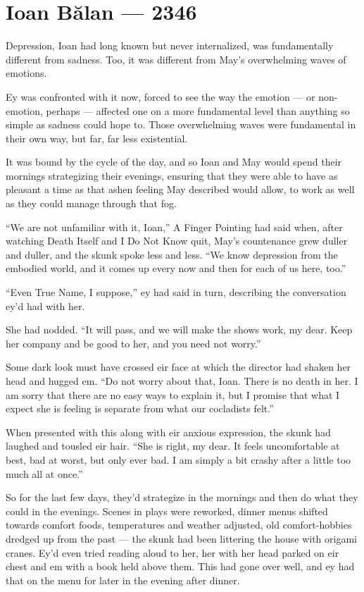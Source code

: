 \hypertarget{ioan-bux103lan-2346}{%
\chapter{Ioan Bălan — 2346}\label{ioan-bux103lan-2346}}

Depression, Ioan had long known but never internalized, was fundamentally different from sadness. Too, it was different from May's overwhelming waves of emotions.

Ey was confronted with it now, forced to see the way the emotion — or non-emotion, perhaps — affected one on a more fundamental level than anything so simple as sadness could hope to. Those overwhelming waves were fundamental in their own way, but far, far less existential.

It was bound by the cycle of the day, and so Ioan and May would spend their mornings strategizing their evenings, ensuring that they were able to have as pleasant a time as that ashen feeling May described would allow, to work as well as they could manage through that fog.

``We are not unfamiliar with it, Ioan,'' A Finger Pointing had said when, after watching Death Itself and I Do Not Know quit, May's countenance grew duller and duller, and the skunk spoke less and less. ``We know depression from the embodied world, and it comes up every now and then for each of us here, too.''

``Even True Name, I suppose,'' ey had said in turn, describing the conversation ey'd had with her.

She had nodded. ``It will pass, and we will make the shows work, my dear. Keep her company and be good to her, and you need not worry.''

Some dark look must have crossed eir face at which the director had shaken her head and hugged em. ``Do not worry about that, Ioan. There is no death in her. I am sorry that there are no easy ways to explain it, but I promise that what I expect she is feeling is separate from what our cocladists felt.''

When presented with this along with eir anxious expression, the skunk had laughed and tousled eir hair. ``She is right, my dear. It feels uncomfortable at best, bad at worst, but only ever bad. I am simply a bit crashy after a little too much all at once.''

So for the last few days, they'd strategize in the mornings and then do what they could in the evenings. Scenes in plays were reworked, dinner menus shifted towards comfort foods, temperatures and weather adjusted, old comfort-hobbies dredged up from the past — the skunk had been littering the house with origami cranes. Ey'd even tried reading aloud to her, her with her head parked on eir chest and em with a book held above them. This had gone over well, and ey had that on the menu for later in the evening after dinner.


